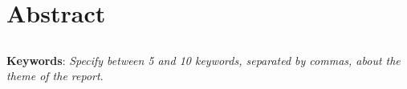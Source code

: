 \chapter{Abstract}
\section*{\textit{\TITULO}}



\textbf{Keywords}: \textit{Specify between 5 and 10 keywords, separated by commas, about the theme of the report}.